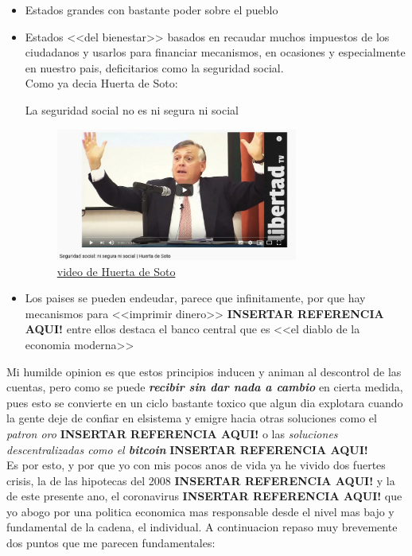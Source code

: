\begin{itemize}
	\item Estados grandes con bastante poder sobre el pueblo
	\item {Estados <<del bienestar>> basados en recaudar muchos impuestos de los ciudadanos y usarlos para financiar mecanismos, en ocasiones y especialmente en nuestro pais, deficitarios como la seguridad social.\\

		Como ya decia Huerta de Soto: 
		\begin{displayquote}
			La seguridad social no es ni segura ni social
		\end{displayquote}

		\begin{figure}[H]
			\centering
			\includegraphics[width=0.75\textwidth]{figures/seguridad_social.png}
			\caption{\href{https://www.youtube.com/watch?v=NWA4nKAQjR4}{video de Huerta de Soto}}
		\end{figure}
		}
	\item Los paises se pueden endeudar, parece que infinitamente, por que hay mecanismos para <<imprimir dinero>> \textbf{INSERTAR REFERENCIA AQUI!} entre ellos destaca el banco central que es <<el diablo de la economia moderna>>
\end{itemize}

Mi humilde opinion es que estos principios inducen y animan al descontrol de las cuentas, pero como se puede \textbf{\textit{recibir sin dar nada a cambio}} en cierta medida, pues esto se convierte en un ciclo bastante toxico que algun dia explotara cuando la gente deje de confiar en elsistema y emigre hacia otras soluciones como el \textit{patron oro} \textbf{INSERTAR REFERENCIA AQUI!} o las \textit{soluciones descentralizadas como el \textbf{bitcoin}} \textbf{INSERTAR REFERENCIA AQUI!}\\

Es por esto, y por que yo con mis pocos anos de vida ya he vivido dos fuertes crisis, la de las hipotecas del 2008 \textbf{INSERTAR REFERENCIA AQUI!} y la de este presente ano, el coronavirus \textbf{INSERTAR REFERENCIA AQUI!} que yo abogo por una politica economica mas responsable desde el nivel mas bajo y fundamental de la cadena, el individual. A continuacion repaso muy brevemente dos puntos que me parecen fundamentales:


